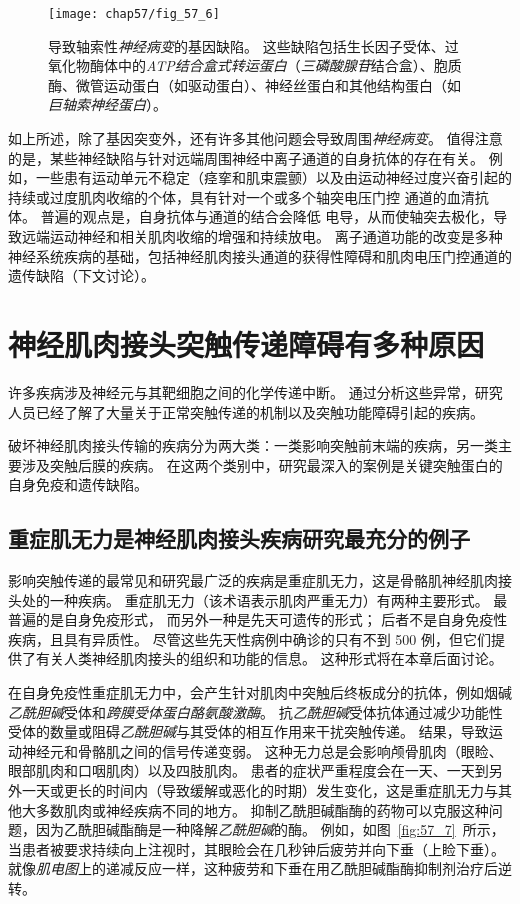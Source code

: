 \begin{figure}[htbp]
	\centering
	\texttt{[image: chap57/fig\_57\_6]}
	\caption{导致轴索性\textit{神经病变}的基因缺陷。
		这些缺陷包括生长因子受体、过氧化物酶体中的\textit{ATP结合盒式转运蛋白}（\textit{三磷酸腺苷}结合盒）、胞质酶、微管运动蛋白（如驱动蛋白）、神经丝蛋白和其他结构蛋白（如\textit{巨轴索神经蛋白}）\cite{brown2002inherited}。}
	\label{fig:57_6}
\end{figure}


如上所述，除了基因突变外，还有许多其他问题会导致周围\textit{神经病变}。
值得注意的是，某些神经缺陷与针对远端周围神经中离子通道的自身抗体的存在有关。
例如，一些患有运动单元不稳定（痉挛和肌束震颤）以及由运动神经过度兴奋引起的持续或过度肌肉收缩的个体，具有针对一个或多个轴突电压门控  通道的血清抗体。
普遍的观点是，自身抗体与通道的结合会降低  电导，从而使轴突去极化，导致远端运动神经和相关肌肉收缩的增强和持续放电。
离子通道功能的改变是多种神经系统疾病的基础，包括神经肌肉接头通道的获得性障碍和肌肉电压门控通道的遗传缺陷（下文讨论）。



\section{神经肌肉接头突触传递障碍有多种原因}

许多疾病涉及神经元与其靶细胞之间的化学传递中断。
通过分析这些异常，研究人员已经了解了大量关于正常突触传递的机制以及突触功能障碍引起的疾病。


破坏神经肌肉接头传输的疾病分为两大类：一类影响突触前末端的疾病，另一类主要涉及突触后膜的疾病。
在这两个类别中，研究最深入的案例是关键突触蛋白的自身免疫和遗传缺陷。



\subsection{重症肌无力是神经肌肉接头疾病研究最充分的例子}

影响突触传递的最常见和研究最广泛的疾病是重症肌无力，这是骨骼肌神经肌肉接头处的一种疾病。
重症肌无力（该术语表示肌肉严重无力）有两种主要形式。
最普遍的是自身免疫形式，
而另外一种是先天可遗传的形式；
后者不是自身免疫性疾病，且具有异质性。
尽管这些先天性病例中确诊的只有不到 500 例，但它们提供了有关人类神经肌肉接头的组织和功能的信息。
这种形式将在本章后面讨论。


在自身免疫性重症肌无力中，会产生针对肌肉中突触后终板成分的抗体，例如烟碱\textit{乙酰胆碱}受体和\textit{跨膜受体蛋白酪氨酸激酶}。
抗\textit{乙酰胆碱}受体抗体通过减少功能性受体的数量或阻碍\textit{乙酰胆碱}与其受体的相互作用来干扰突触传递。
结果，导致运动神经元和骨骼肌之间的信号传递变弱。
这种无力总是会影响颅骨肌肉（眼睑、眼部肌肉和口咽肌肉）以及四肢肌肉。
患者的症状严重程度会在一天、一天到另外一天或更长的时间内（导致缓解或恶化的时期）发生变化，这是重症肌无力与其他大多数肌肉或神经疾病不同的地方。
抑制乙酰胆碱酯酶的药物可以克服这种问题，因为乙酰胆碱酯酶是一种降解\textit{乙酰胆碱}的酶。
例如，如图~\ref{fig:57_7}~所示，当患者被要求持续向上注视时，其眼睑会在几秒钟后疲劳并向下垂（上睑下垂）。
就像\textit{肌电图}上的递减反应一样，这种疲劳和下垂在用乙酰胆碱酯酶抑制剂治疗后逆转。



